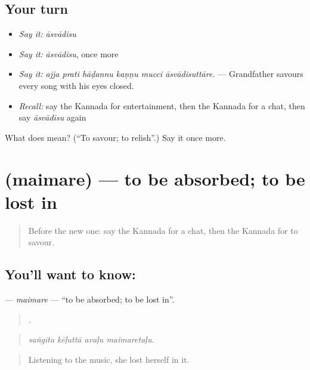 \subsection*{Your turn}
\begin{itemize}
\raggedright
  \item \emph{Say it:} \emph{āsvādisu}
  \item \emph{Say it:} \emph{āsvādisu}, once more
  \item \emph{Say it:} \emph{ajja prati hāḍannu kaṇṇu mucci āsvādisuttāre.} — Grandfather savours every song with his eyes closed.
  \item \emph{Recall:} say the Kannada for entertainment, then the Kannada for a chat, then say \emph{āsvādisu} again
\end{itemize}

\begin{tcolorbox}[breakable,colback=teal!4,colframe=teal!35!black,title={Before you move on}]
What does  mean? (\textquotedblleft{}To savour; to relish\textquotedblright{}.) Say it once more.
\end{tcolorbox}
\section[\texorpdfstring{\kn{ಮೈಮರೆ} (maimare)}{ಮೈಮರೆ (maimare)}]{ (maimare) — to be absorbed; to be lost in}

\label{lesson:KA-C530-maimare}



\begin{quote}
Before the new one: say the Kannada for a chat, then the Kannada for to savour.
\end{quote}

\subsection*{You'll want to know: }
\textbf{} — \emph{maimare} — \textquotedblleft{}to be absorbed; to be lost in\textquotedblright{}.

\begin{quote}
   .
\end{quote}

\begin{quote}
\emph{saṅgīta kēḷuttā avaḷu maimaretaḷu.}
\end{quote}

\begin{quote}
Listening to the music, she lost herself in it.
\end{quote}

